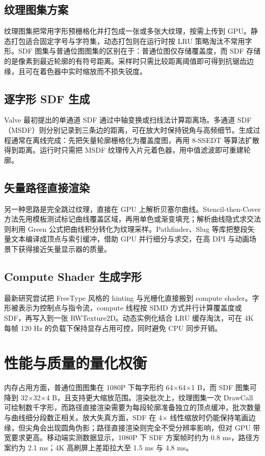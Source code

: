 \section{纹理图集方案}
纹理图集把常用字形预栅格化并打包成一张或多张大纹理，按需上传到 GPU。静态打包适合固定字号与字符集，动态打包则在运行时按 LRU 策略淘汰不常用字形。SDF 图集与普通位图图集的区别在于：普通位图仅存储覆盖度，而 SDF 存储的是像素到最近轮廓的有符号距离。采样时只需比较距离阈值即可得到抗锯齿边缘，且可在着色器中实时缩放而不损失锐度。\par
\section{逐字形 SDF 生成}
Valve 最初提出的单通道 SDF 通过中轴变换或扫线法计算距离场。多通道 SDF（MSDF）则分别记录到三条边的距离，可在放大时保持锐角与高频细节。生成过程通常在离线完成：先把矢量轮廓栅格化为覆盖度图，再用 8-SSEDT 等算法扩散得到距离。运行时只需把 MSDF 纹理传入片元着色器，用中值滤波即可重建轮廓。\par
\section{矢量路径直接渲染}
另一种思路是完全跳过纹理，直接在 GPU 上解析贝塞尔曲线。Stencil-then-Cover 方法先用模板测试标记曲线覆盖区域，再用单色或渐变填充；解析曲线隐式求交法则利用 Green 公式把曲线积分转化为纹理采样。Pathfinder、Slug 等库把整段矢量文本编译成顶点与索引缓冲，借助 GPU 并行细分与求交，在高 DPI 与动画场景下获得接近矢量显示器的质量。\par
\section{Compute Shader 生成字形}
最新研究尝试把 FreeType 风格的 hinting 与光栅化直接搬到 compute shader。字形被表示为控制点与指令流，compute 线程按 SIMD 方式并行计算覆盖度或 SDF，再写入到一张 RWTexture2D。动态实例化结合 LRU 缓存淘汰，可在 4K 每帧 120 Hz 的负载下保持显存占用可控，同时避免 CPU 同步开销。\par
\chapter{性能与质量的量化权衡}
内存占用方面，普通位图图集在 1080P 下每字形约 64×64×1 B，而 SDF 图集可降到 32×32×4 B，且支持更大缩放范围。渲染批次上，纹理图集一次 DrawCall 可绘制数千字形，而路径直接渲染需要为每段轮廓准备独立的顶点缓冲，批次数量与曲线细分段数正相关。放大失真方面，SDF 在 4× 线性缩放时仍能保持笔画边缘，但尖角会出现圆角伪影；路径直接渲染则完全不受分辨率影响，但对 GPU 带宽要求更高。移动端实测数据显示，1080P 下 SDF 方案帧时约为 0.8 ms，路径方案约为 2.1 ms；4K 高刷屏上差距拉大至 1.5 ms 与 4.8 ms。\par
